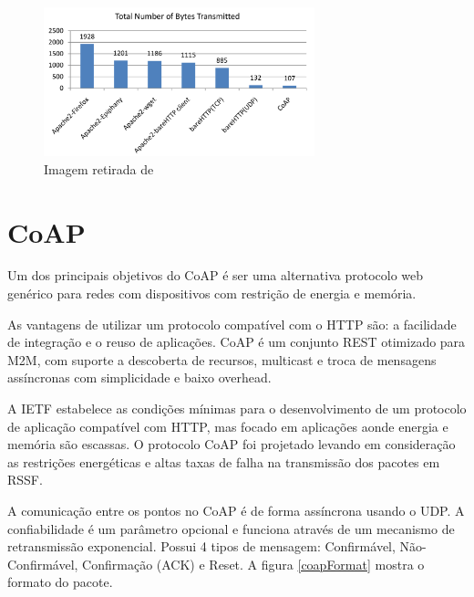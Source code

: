 \begin{figure}[h]
    \label{bytesTransmitted}
    \centering
    \includegraphics[width=0.7\textwidth]{figuras/bytestransmitted.png}
    \caption{Imagem retirada de \cite{transportApp}}
\end{figure}






\section{CoAP}

Um dos principais objetivos do CoAP \'e ser uma alternativa protocolo web gen\'erico para redes com dispositivos com restri\c{c}\~ao de energia e mem\'oria.

As vantagens de utilizar um protocolo compat\'ivel com o HTTP s\~ao: a facilidade de integra\c{c}\~ao e o reuso de aplica\c{c}\~oes. CoAP \'e um conjunto REST otimizado para M2M, com suporte a descoberta de recursos, multicast e troca de mensagens ass\'incronas com simplicidade e baixo overhead.

A IETF estabelece as condi\c{c}\~oes m\'inimas para o desenvolvimento de um protocolo de aplica\c{c}\~ao compat\'ivel com HTTP, mas focado em aplica\c{c}\~oes aonde energia e mem\'oria s\~ao escassas. O protocolo CoAP foi projetado levando em considera\c{c}\~ao as restri\c{c}\~oes energ\'eticas e altas taxas de falha na transmiss\~ao dos pacotes em RSSF.

A comunica\c{c}\~ao entre os pontos no CoAP \'e de forma ass\'incrona usando o UDP. A confiabilidade \'e um par\^ametro opcional e funciona atrav\'es de um mecanismo de retransmiss\~ao exponencial. Possui 4 tipos de mensagem: Confirm\'avel, N\~ao-Confirm\'avel, Confirma\c{c}\~ao (ACK) e Reset. A figura \ref{coapFormat} mostra o formato do pacote.

